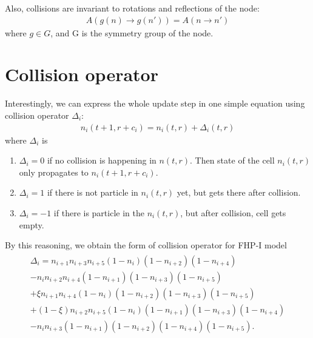 Also, collisions are invariant to rotations and reflections of the node:
\begin{align*}
A(g(n) \rightarrow g(n')) = A(n \rightarrow n')
\end{align*}
where $g \in G$, and G is the symmetry group of the node.


\section{Collision operator}
Interestingly, we can express the whole update step in one simple equation using collision operator $\Delta_i$:
\begin{align} \label{withcol}
n_i(t+1,r+c_i) = n_i(t,r) + \Delta_i(t,r)
\end{align}
where $\Delta_i$ is
\begin{enumerate}
\item $\Delta_i = 0$ if no collision is happening in $n(t,r)$. Then state of the cell $n_i(t,r)$ only propagates to $n_i(t+1,r+c_i)$.
\item $\Delta_i = 1$ if there is not particle in $n_i(t,r)$ yet, but gets there after collision. 
\item $\Delta_i = -1$ if there is particle in the $n_i(t,r)$, but after collision, cell gets empty.
\end{enumerate}

\bigskip


By this reasoning, we obtain the form of collision operator for FHP-I model
\begin{align} \label{colop}
\begin{split}
\Delta_i = n_{i+1}n_{i+3}n_{i+5}(1-n_i)(1-n_{i+2})(1-n_{i+4})\\
-n_in_{i+2}n_{i+4}(1-n_{i+1})(1-n_{i+3})(1-n_{i+5})\\
 + \xi n_{i+1}n_{i+4}(1-n_i)(1-n_{i+2})(1-n_{i+3})(1-n_{i+5})\\
 +(1-\xi)n_{i+2}n_{i+5}(1-n_i)(1-n_{i+1})(1-n_{i+3})(1-n_{i+4})\\
 -n_in_{i+3}(1-n_{i+1})(1-n_{i+2})(1-n_{i+4})(1-n_{i+5}).
\end{split}
\end{align}

